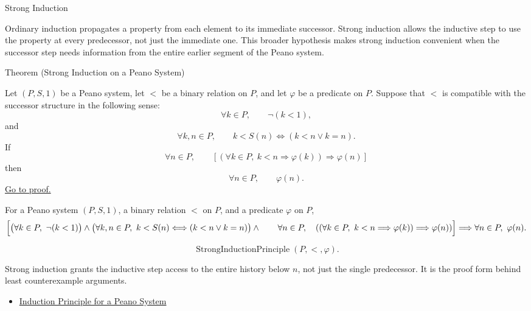 \begin{topicbox}{Strong Induction}
\begin{exposition}
Ordinary induction propagates a property from each element to its immediate
successor. Strong induction allows the inductive step to use the property at
every predecessor, not just the immediate one. This broader hypothesis makes
strong induction convenient when the successor step needs information from the
entire earlier segment of the Peano system.
\end{exposition}

\begin{theorembox}{Theorem (Strong Induction on a Peano System)}
\begin{theorem}
\label{thm:strong-induction-on-peano-system}
Let $(P,S,1)$ be a Peano system, let $<$ be a binary relation on $P$, and let
$\varphi$ be a predicate on $P$. Suppose that $<$ is compatible with the
successor structure in the following sense:
\[
\forall k\in P,\qquad \neg(k<1),
\]
and
\[
\forall k,n\in P,\qquad
k<S(n)\Longleftrightarrow (k<n\lor k=n).
\]
If
\[
\forall n \in P,\qquad
\left[
\left(\forall k \in P,\ k < n \Longrightarrow \varphi(k)\right)
\Longrightarrow \varphi(n)
\right]
\]
then
\[
\forall n \in P,\qquad \varphi(n).
\]
\hyperref[prf:strong-induction-on-peano-system]{Go to proof.}
\end{theorem}
\end{theorembox}

\begin{remark*}
For a Peano system $(P,S,1)$, a binary relation $<$ on $P$, and a predicate
$\varphi$ on $P$,
\[
\Bigl[
\bigl(\forall k\in P,\ \neg(k<1)\bigr)
\land
\bigl(\forall k,n\in P,\ k<S(n)\Longleftrightarrow(k<n\lor k=n)\bigr)
\land\\
\qquad
\forall n \in P,\quad
\left(
\left(\forall k \in P,\ k < n \Longrightarrow \varphi(k)\right)
\Longrightarrow \varphi(n)
\right)
\Bigr]
\Longrightarrow
\forall n \in P,\ \varphi(n).
\]
\end{remark*}

\begin{remark*}
\[
\operatorname{StrongInductionPrinciple}(P,<,\varphi).
\]
\end{remark*}

\begin{remark*}[Interpretation]
Strong induction grants the inductive step access to the entire history below
$n$, not just the single predecessor. It is the proof form behind least
counterexample arguments.
\end{remark*}

\begin{dependencies}
\begin{itemize}
  \item \hyperref[thm:induction-principle-for-peano-system]{Induction Principle for a Peano System}
\end{itemize}
\end{dependencies}
\end{topicbox}

